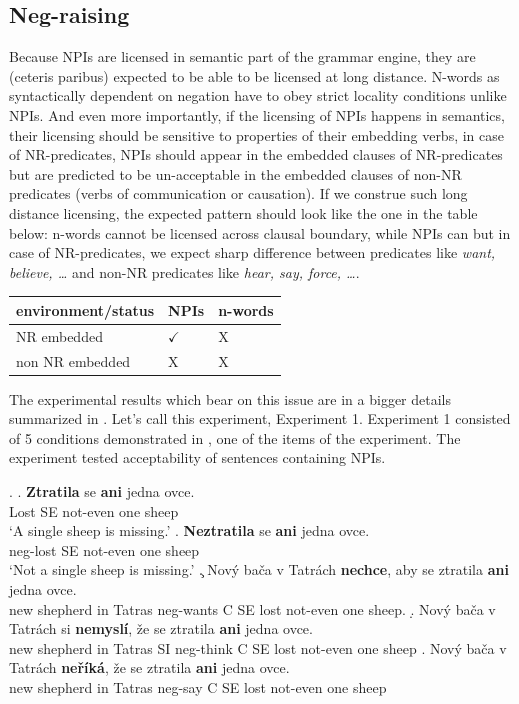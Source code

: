 \documentclass[12pt]{scrartcl}
\begin{document}
\hypertarget{neg-raising}{%
\subsection{Neg-raising}\label{neg-raising}}

Because NPIs are licensed in semantic part of the grammar engine, they are (ceteris paribus) expected to be able to be licensed at long distance. N-words as syntactically dependent on negation have to obey strict locality conditions unlike NPIs. And even more importantly, if the licensing of NPIs happens in semantics, their licensing should be sensitive to properties of their embedding verbs, in case of NR-predicates, NPIs should appear in the embedded clauses of NR-predicates but are predicted to be un-acceptable in the embedded clauses of non-NR predicates (verbs of communication or causation). If we construe such long distance licensing, the expected pattern should look like the one in the table below: n-words cannot be licensed across clausal boundary, while NPIs can but in case of NR-predicates, we expect sharp difference between predicates like \textit{want, believe, \ldots} and non-NR predicates like \textit{hear, say, force, \ldots}.

\begin{longtable}[]{@{}lll@{}}
\toprule
environment/status & NPIs & n-words\tabularnewline
\midrule
\endhead
NR embedded & \(\checkmark\) & X\tabularnewline
non NR embedded & X & X\tabularnewline
\bottomrule
\end{longtable}

The experimental results which bear on this issue are in a bigger details summarized in \cite{dovcekal2016experimental}. Let's call this experiment, Experiment 1. Experiment 1 consisted of 5 conditions demonstrated in \Next, one of the items of the experiment. The experiment tested acceptability of sentences containing NPIs.

\ex. \ag. \textbf{Ztratila} se \textbf{ani} jedna ovce.\\
Lost SE not-even one sheep\\
`A single sheep is missing.' \bg. \textbf{Neztratila} se \textbf{ani}
jedna ovce.\\
neg-lost SE not-even one sheep\\
`Not a single sheep is missing.' \c. Nový bača v Tatrách
\textbf{nechce}, aby se ztratila \textbf{ani} jedna ovce.\\
new shepherd in Tatras neg-wants C SE lost not-even one sheep. \d. Nový
bača v Tatrách si \textbf{nemyslí}, že se ztratila \textbf{ani} jedna
ovce.\\
new shepherd in Tatras SI neg-think C SE lost not-even one sheep \e.
Nový bača v Tatrách \textbf{neříká}, že se ztratila \textbf{ani} jedna
ovce.\\
new shepherd in Tatras neg-say C SE lost not-even one sheep
\end{document}
